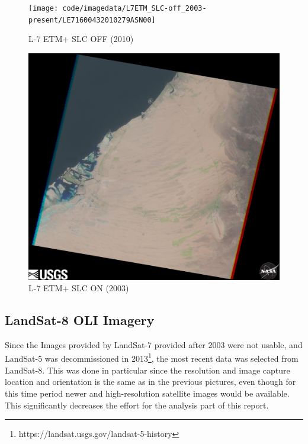\begin{figure}[h!]
\centering
\begin{minipage}{.5\textwidth}
	\centering
	\texttt{[image: code/imagedata/L7ETM\_SLC-off\_2003-present/LE71600432010279ASN00]}
	\caption{L-7 ETM+ SLC OFF (2010)}
	\label{fig:L7SLCOFF}
\end{minipage}%
\begin{minipage}{.5\textwidth}
	\centering
	\includegraphics[width=\textwidth-3em]{code/imagedata/L7ETM_SLC-on_1999-2003/LE71600432003148ASN00.jpg}
	\caption{L-7 ETM+ SLC ON (2003)}
	\label{fig:L7SLCON}
\end{minipage}
\end{figure}

\subsection{LandSat-8 OLI Imagery}
Since the Images provided by LandSat-7 provided after 2003 were not usable, and LandSat-5 was decommissioned in 2013\footnote{https://landsat.usgs.gov/landsat-5-history}, the most recent data was selected from LandSat-8. This was done in particular since the resolution and image capture location and orientation is the same as in the previous pictures, even though for this time period newer and high-resolution satellite images would be available. This significantly decreases the effort for the analysis part of this report.

